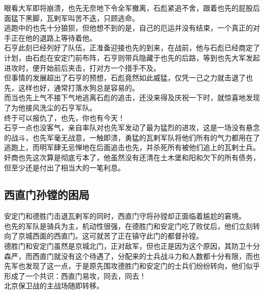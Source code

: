 \begin{multicols}{\theparacolNo}
眼看大军即将崩溃，也先无奈地下令全军撤离，石彪紧追不舍，跟着也先的屁股后面猛下黑脚，瓦剌军叫苦不迭，只顾逃命。\\

逃跑中的也先十分狼狈，但他想不到的是，自己的厄运并没有结束，一个真正的对手正在他的退路上等待着他。\\

石亨此刻已经列好了队伍，正准备迎接也先的到来，在战前，他与石彪已经商定了计划，由石彪在安定门前布阵，石亨则带兵隐藏于也先的后路，等到也先大军发起进攻时，便开始前后夹击，打对方一个措手不及。\\

但事情的发展超出了石亨的预想，石彪竟然如此威猛，仅凭一己之力就击退了也先，这样也好，通常打落水狗总是容易的。\\

而当也先上气不接下气地逃离石彪的追击，还没来得及庆祝一下时，就惊喜地发现了为他接风洗尘的石亨军队。\\

终于可以报仇了，也先，你也有今天！\\

石亨一点也没客气，亲自率队对也先军发动了最为猛烈的进攻，这是一场没有悬念的战斗，也先军毫无战意，一触即溃，勇猛的瓦剌军队将他们所有的气力都用在了逃跑上，而明军肆无忌惮地在后面追击也先，并杀死所有被他们追上的瓦剌士兵。\\

奸商也先这次算是彻底亏本了，他虽然没有还清在土木堡和阳和欠下的所有债务，但至少还是付出了相当大的一笔利息。\\

\subsection{西直门孙镗的困局}
安定门和德胜门击退瓦剌军的同时，西直门守将孙镗却正面临着尴尬的窘境。\\

也先的军队是骑兵为主，机动性很强，在德胜门和安定门吃了败仗后，他们立刻转向了京城西面的西直门。这可就苦了正在镇守此门的都督孙镗。\\

德胜门和安定门虽然是京城北门，正对敌军，但也正是因为这个原因，其防卫十分森严，而西直门就没有这个待遇了，分配来的士兵战斗力和人数都十分有限，而也先军也发现了这一点，于是原先围攻德胜门和安定门的士兵们纷纷转向，他们似乎形成了一个共识：西直门易攻，同去，同去！\\

北京保卫战的主战场随即转移。\\


\end{multicols}
